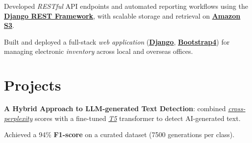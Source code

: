 \documentclass[]{openfont}
\begin{document}
\begin{minipage}[t]{0.65\textwidth}
    \begin{tightemize}
        \item Developed \textit{RESTful} API endpoints and automated reporting workflows using the \textbf{\href{https://www.django-rest-framework.org/}{Django REST Framework}}, with scalable storage and retrieval on \href{https://aws.amazon.com/s3/}{\textbf{Amazon S3}}.
    \end{tightemize}
    \sectionsep

    \begin{tightemize}
        \item Built and deployed a full-stack \textit{web application} (\href{https://www.djangoproject.com/}{\textbf{Django}}, \href{https://getbootstrap.com/}{\textbf{Bootstrap4}}) for managing electronic \textit{inventory} across local and overseas offices.
    \end{tightemize}
    \sectionsep


    \section{Projects}
    \begin{tightemize}
        \item \textbf{A Hybrid Approach to LLM-generated Text Detection}: combined \href{https://huggingface.co/spaces/evaluate-metric/perplexity}{\textit{cross-perplexity}} scores with a fine-tuned \href{https://en.wikipedia.org/wiki/T5_(language_model)}{\textit{T5}} transformer to detect AI-generated text.
        \item Achieved a 94\% \textbf{F1-score} on a curated dataset (7500 generations per class).
    \end{tightemize}
    \sectionsep


\end{minipage}
\end{document}
